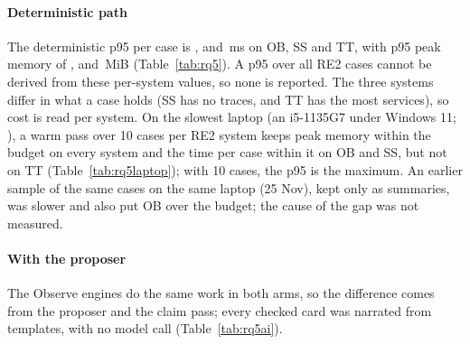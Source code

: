 \paragraph{Deterministic path}
The deterministic p95 per case is ,  and \,ms on OB, SS and TT, with p95 peak memory of ,  and \,MiB (Table~\ref{tab:rq5}).
A p95 over all RE2 cases cannot be derived from these per-system values, so none is reported.
The three systems differ in what a case holds (SS has no traces, and TT has the most services), so cost is read per system.
On the slowest laptop (an i5-1135G7 under Windows 11; ), a warm pass over 10 cases per RE2 system keeps peak memory within the budget on every system and the time per case within it on OB and SS, but not on TT (Table~\ref{tab:rq5laptop}); with 10 cases, the p95 is the maximum.
An earlier sample of the same cases on the same laptop (25 Nov), kept only as summaries, was slower and also put OB over the budget; the cause of the gap was not measured.

\paragraph{With the proposer}
The Observe engines do the same work in both arms, so the difference comes from the proposer and the claim pass; every checked card was narrated from templates, with no model call (Table~\ref{tab:rq5ai}).

